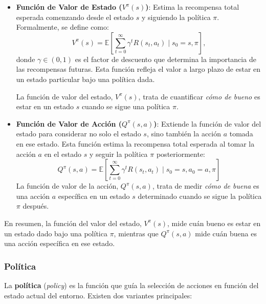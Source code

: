 \documentclass[a4paper,12pt, twoside]{report}
\begin{document}
\begin{itemize}
    \item \textbf{Función de Valor de Estado (\(V^{\pi}(s)\))}: Estima la recompensa total esperada 
    comenzando desde el estado \(s\) y siguiendo la política \(\pi\). Formalmente, se define como:
    \begin{equation}
    V^{\pi}(s) = \mathbb{E}\left[\sum_{t=0}^{\infty} \gamma^t R(s_t, a_t) \mid s_0 = s, \pi\right],
    \end{equation}
    donde \(\gamma \in (0, 1)\) es el factor de descuento que determina la importancia de las 
    recompensas futuras. Esta función refleja el valor a largo plazo de estar en un estado particular 
    bajo una política dada.

    La función de valor del estado, \(V^{\pi}(s)\), trata de cuantificar \textit{cómo de bueno} es 
    estar en un estado \(s\) cuando se sigue una política \(\pi\).

    \item \textbf{Función de Valor de Acción (\(Q^{\pi}(s, a)\))}: Extiende la función de valor del 
    estado para considerar no solo el estado \(s\), sino también la acción \(a\) tomada en ese estado. 
    Esta función estima la recompensa total esperada al tomar la acción \(a\) en el estado \(s\) y 
    seguir la política \(\pi\) posteriormente:
    \begin{equation}
    Q^{\pi}(s, a) = \mathbb{E}\left[\sum_{t=0}^{\infty} \gamma^t R(s_t, a_t) \mid s_0 = s, a_0 = a, \pi\right]
    \end{equation}
    La función de valor de la acción, \(Q^{\pi}(s, a)\), trata de medir \textit{cómo de buena} es una 
    acción \(a\) específica en un estado \(s\) determinado cuando se sigue la política \(\pi\) después.
 
\end{itemize}

En resumen, la función del valor del estado, \(V^{\pi}(s)\), mide cuán bueno es estar en un estado dado 
bajo una política \(\pi\), mientras que \(Q^{\pi}(s, a)\) mide cuán buena es una acción específica en 
ese estado.

\subsubsection{Política}

La \textbf{política} (\textit{policy}) es la función que guía la selección de acciones en función del estado actual del entorno. Existen dos variantes principales:
\end{document}
